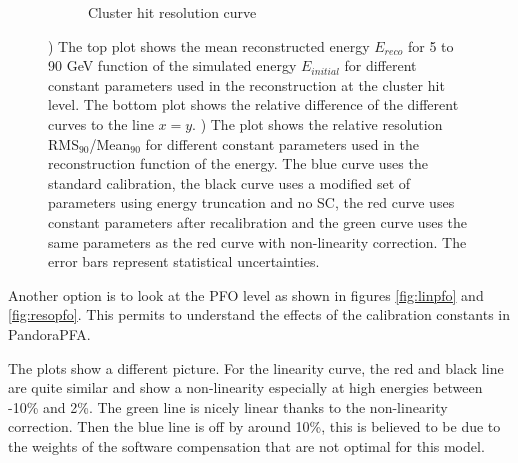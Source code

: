 \begin{figure}[htbp!]
\begin{subfigure}[t]{0.5\textwidth}
    \caption{Cluster hit resolution curve} \label{fig:resohits}
  \end{subfigure}
  \caption{) The top plot shows the mean reconstructed energy $E_{reco}$ for 5 to 90 GeV \kzeroL{} function of the simulated energy $E_{initial}$ for different constant parameters used in the reconstruction at the cluster hit level. The bottom plot shows the relative difference of the different curves to the line $x = y$. ) The plot shows the relative resolution RMS$_{90}$/Mean$_{90}$ for different constant parameters used in the reconstruction function of the energy. The blue curve uses the standard calibration, the black curve uses a modified set of parameters using energy truncation and no SC, the red curve uses constant parameters after recalibration and the green curve uses the same parameters as the red curve with non-linearity correction. The error bars represent statistical uncertainties.}
\end{figure}

Another option is to look at the PFO level as shown in figures \ref{fig:linpfo} and \ref{fig:resopfo}. This permits to understand the effects of the calibration constants in PandoraPFA.

The plots show a different picture. For the linearity curve, the red and black line are quite similar and show a non-linearity especially at high energies between -10\% and 2\%. The green line is nicely linear thanks to the non-linearity correction. Then the blue line is off by around 10\%, this is believed to be due to the weights of the software compensation that are not optimal for this model.

